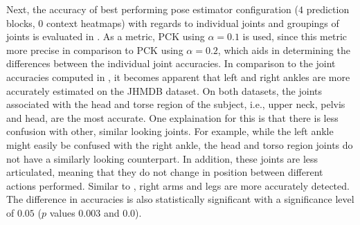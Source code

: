Next, the accuracy of best performing pose estimator configuration ($4$ prediction blocks, $0$ context heatmaps) with regards to individual joints and groupings of joints is evaluated in .
As a metric, PCK using $\alpha = 0.1$ is used, since this metric more precise in comparison to PCK using $\alpha = 0.2$, which aids in determining the differences between the individual joint accuracies.
In comparison to the joint accuracies computed in , it becomes apparent that left and right ankles are more accurately estimated on the JHMDB dataset.
On both datasets, the joints associated with the head and torse region of the subject, i.e., upper neck, pelvis and head, are the most accurate.
One explaination for this is that there is less confusion with other, similar looking joints.
For example, while the left ankle might easily be confused with the right ankle, the head and torso region joints do not have a similarly looking counterpart.
In addition, these joints are less articulated, meaning that they do not change in position between different actions performed.
Similar to , right arms and legs are more accurately detected.
The difference in accuracies is also statistically significant with a significance level of $0.05$ ($p$ values $0.003$ and $0.0$).

